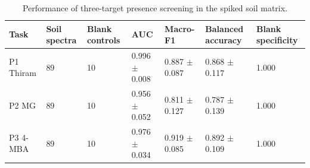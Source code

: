 \begin{table}[htbp]
\centering
\caption{Performance of three-target presence screening in the spiked soil matrix.}
\label{tab:s4_soil_screening_metrics}
\footnotesize
\begin{tabularx}{\textwidth}{L{2.2cm}L{1.45cm}L{1.45cm}L{2.15cm}L{2.25cm}L{2.55cm}L{1.75cm}}
\toprule
Task & Soil spectra & Blank controls & AUC & Macro-F1 & Balanced accuracy & Blank specificity \\
\midrule
P1 Thiram & 89 & 10 & 0.996 $\pm$ 0.008 & 0.887 $\pm$ 0.087 & 0.868 $\pm$ 0.117 & 1.000 \\
P2 MG & 89 & 10 & 0.956 $\pm$ 0.052 & 0.811 $\pm$ 0.127 & 0.787 $\pm$ 0.139 & 1.000 \\
P3 4-MBA & 89 & 10 & 0.976 $\pm$ 0.034 & 0.919 $\pm$ 0.085 & 0.892 $\pm$ 0.109 & 1.000 \\
\bottomrule
\end{tabularx}
\end{table}
